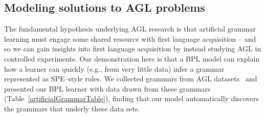 \documentclass{article}
\begin{document}
\subsection{Modeling solutions to AGL problems}


The fundamental hypothesis underlying AGL research is that
artificial grammar learning must engage some shared resource with first language acquisition --
and so we can gain insights into first language acquisition by
instead studying AGL in controlled experiments.
Our demonstration here is that
a BPL model can explain how a learner can quickly (e.g., from very little data) infer a grammar represented as SPE--style rules.
We collected grammars from AGL datasets~\cite{gerken2010infants,marcus1999rule,frank2011three}
and presented our BPL learner with data drawn from these grammars (Table~\ref{artificialGrammarTable}),
finding that our model automatically discovers the grammars that
 underly these data sets.
\end{document}
